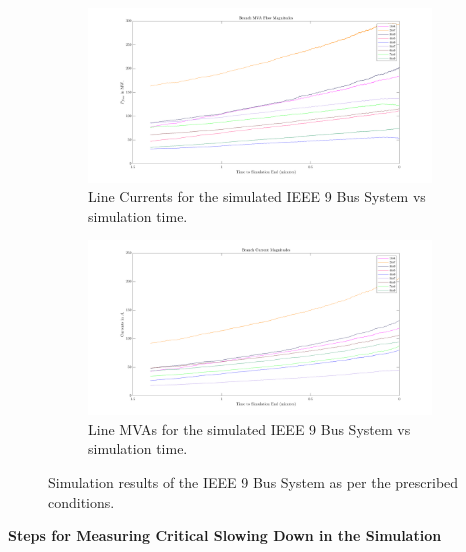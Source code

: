 \begin{figure}[!htpb]
	\begin{subfigure}{\textwidth}
		\centering
		\includegraphics[scale=0.25]{../figures/analysis_matlab/currents_run02}
		\caption{Line Currents for the simulated IEEE 9 Bus System vs simulation time.}
	\end{subfigure}
	
	\begin{subfigure}{\textwidth}
		\centering
		\includegraphics[scale=0.25]{../figures/analysis_matlab/mvas_run02}
		\caption{Line MVAs for the simulated IEEE 9 Bus System vs simulation time.}
	\end{subfigure}

	\caption{Simulation results of the IEEE 9 Bus System as per the prescribed conditions.}
\end{figure}

\clearpage
\textbf{Steps for Measuring Critical Slowing Down in the Simulation}

